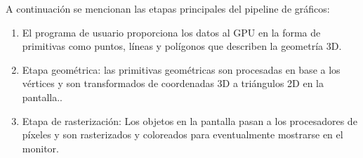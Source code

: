 A continuación se mencionan las etapas principales del pipeline de gráficos:
\begin{enumerate}

\item El programa de usuario proporciona los datos al GPU en la forma de primitivas como puntos, líneas y polígonos que describen la geometría 3D. 
\item Etapa geométrica: las primitivas geométricas son procesadas en base a los vértices y son transformados de coordenadas 3D a triángulos 2D en la pantalla.. 
\item Etapa de rasterización: Los objetos en la pantalla pasan a los procesadores de píxeles y son rasterizados y coloreados para eventualmente mostrarse en el monitor.

\end{enumerate}